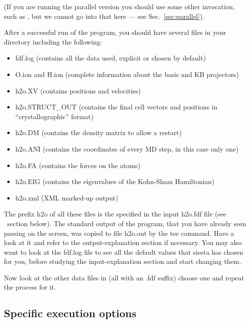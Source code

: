 
\noindent
(If you are running the parallel version you should use some other
invocation, such as , but we cannot
go into that here --- see Sec.~\ref{sec:parallel}).

After a successful run of the program, you should have several
files in your directory including the following:
\begin{itemize}

\item fdf.log
 (contains all the data used, explicit or chosen by default)
\item O.ion and H.ion
 (complete information about the basis and KB projectors)
\item h2o.XV
 (contains positions and velocities)
\item h2o.STRUCT\_OUT
 (contains the final cell vectors and positions in
 ``crystallographic'' format)
\item h2o.DM
 (contains the density matrix to allow a restart)
\item h2o.ANI
 (contains the coordinates of every MD step, in this case only one)
\item h2o.FA
 (contains the forces on the atoms)
\item h2o.EIG
 (contains the eigenvalues of the Kohn-Sham Hamiltonian)
\item h2o.xml
 (XML marked-up output)
\end{itemize}

The prefix h2o of all these files is the 
specified in the input h2o.fdf file (see \fdflib\ section below).
The standard output of the program, that you
have already seen passing on the screen, was copied to
file h2o.out by the tee command. Have a look at it
and refer to the output-explanation section if necessary.
You may also want to look at the fdf.log file to see all
the default values that siesta has chosen for you, before
studying the input-explanation section and start changing them.

Now look at the other data files in 
(all with an .fdf suffix) choose one and repeat the process for it.

\subsection{Specific execution options}


